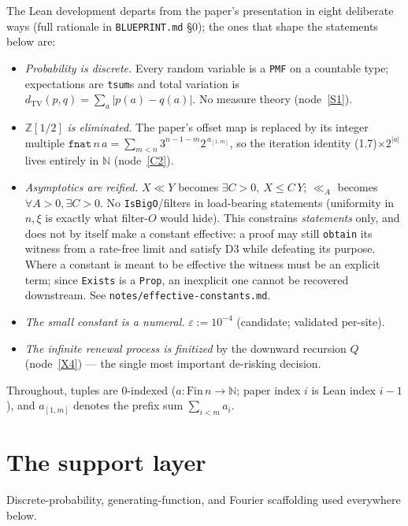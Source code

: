 The Lean development departs from the paper's presentation in eight deliberate ways
(full rationale in \texttt{BLUEPRINT.md} §0); the ones that shape the statements below are:
\begin{itemize}
  \item[\textbf{D1}] \emph{Probability is discrete.}  Every random variable is a \texttt{PMF}
        on a countable type; expectations are \texttt{tsum}s and total variation is
        \(d_{\mathrm{TV}}(p,q)=\sum_a |p(a)-q(a)|\).  No measure theory (node~\ref{S1}).
  \item[\textbf{D2}] \(\mathbb{Z}[1/2]\) \emph{is eliminated.}  The paper's offset map is
        replaced by its integer multiple \(\texttt{fnat}\,n\,a = \sum_{m<n} 3^{n-1-m}
        2^{\,a_{[1,m]}}\), so the iteration identity (1.7)\(\times 2^{|a|}\) lives entirely
        in \(\mathbb{N}\) (node~\ref{C2}).
  \item[\textbf{D3}] \emph{Asymptotics are reified.}  \(X\ll Y\) becomes
        \(\exists C>0,\ X\le C\,Y\); \(\ll_A\) becomes \(\forall A>0,\exists C>0\).  No
        \texttt{IsBigO}/filters in load-bearing statements (uniformity in \(n,\xi\) is
        exactly what filter-\(O\) would hide).  This constrains \emph{statements} only, and
        does not by itself make a constant effective: a proof may still \texttt{obtain} its
        witness from a rate-free limit and satisfy D3 while defeating its purpose.  Where a
        constant is meant to be effective the witness must be an explicit term; since
        \texttt{Exists} is a \texttt{Prop}, an inexplicit one cannot be recovered downstream.
        See \texttt{notes/effective-constants.md}.
  \item[\textbf{D4}] \emph{The small constant is a numeral.}  \(\varepsilon := 10^{-4}\)
        (candidate; validated per-site).
  \item[\textbf{D6}] \emph{The infinite renewal process is finitized} by the downward
        recursion \(Q\) (node~\ref{X4}) --- the single most important de-risking decision.
\end{itemize}
Throughout, tuples are \(0\)-indexed (\(a:\mathrm{Fin}\,n\to\mathbb{N}\); paper index \(i\)
is Lean index \(i-1\)), and \(a_{[1,m]}\) denotes the prefix sum \(\sum_{i<m} a_i\).


\chapter{The support layer}\label{chp:support}

Discrete-probability, generating-function, and Fourier scaffolding used everywhere below.

